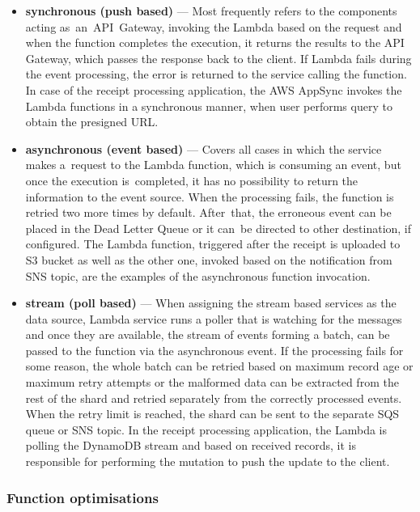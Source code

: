 \begin{itemize}
    \item \textbf{synchronous (push based)} --- Most frequently refers to the components acting as~an~API~Gateway, invoking the Lambda based on the request and when the function completes the execution, it returns the results to the API Gateway, which passes the response back to the client.
    If Lambda fails during the event processing, the error is returned to the service calling the function.
    In case of the receipt processing application, the AWS AppSync invokes the Lambda functions in a synchronous manner, when user performs query to obtain the presigned URL.
    \item \textbf{asynchronous (event based)} --- Covers all cases in which the service makes a~request to the Lambda function, which is consuming an event, but once the execution is~completed, it has no possibility to return the information to the event source. 
    When the processing fails, the function is retried two more times by default.
    After~that, the erroneous event can be placed in the Dead Letter Queue or it can~be directed to other destination, if configured.
    The Lambda function, triggered after the receipt is uploaded to S3 bucket as well as the other one, invoked based on the notification from SNS topic, are the examples of the asynchronous function invocation.
    \item \textbf{stream (poll based)} --- When assigning the stream based services as the data source, Lambda service runs a poller that is watching for the messages and once they are available, the stream of events forming a batch, can be passed to the function via the asynchronous event.
    If the processing fails for some reason, the whole batch can be retried based on maximum record age or maximum retry attempts or the malformed data can be extracted from the rest of the shard and retried separately from the correctly processed events. When the retry limit is reached, the shard can be sent to the separate SQS queue or SNS topic.
    In the receipt processing application, the Lambda is polling the DynamoDB stream and based on received records, it is responsible for performing the mutation to push the update to the client.
\end{itemize}

\subsubsection{Function optimisations}


